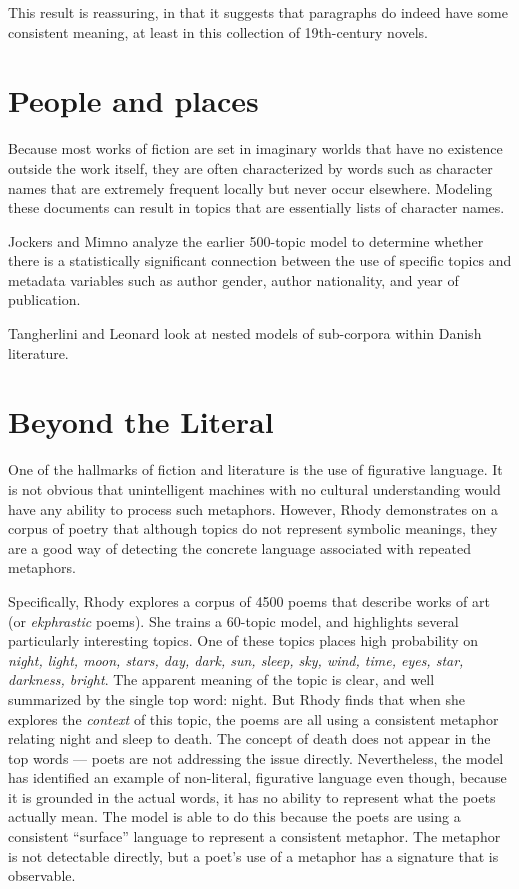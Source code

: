 This result is reassuring, in that it suggests that paragraphs do indeed have some consistent meaning, at least in this collection of 19th-century novels.


\section{People and places}

Because most works of fiction are set in imaginary worlds that have no existence outside the work itself, they are often characterized by words such as character names that are extremely frequent locally but never occur elsewhere. Modeling these documents can result in topics that are essentially lists of character names.

Jockers and Mimno \citep{jockers-13b} analyze the earlier 500-topic model to determine whether there is a statistically significant connection between the use of specific topics and metadata variables such as author gender, author nationality, and year of publication.

Tangherlini and Leonard \citep{tangherlini-13} look at nested models of sub-corpora within Danish literature.

\section{Beyond the Literal}

One of the hallmarks of fiction and literature is the use of figurative language.
It is not obvious that unintelligent machines with no cultural understanding would have any ability to process such metaphors. However, Rhody \citep{rhody-12} demonstrates on a corpus of poetry that although topics do not represent symbolic meanings, they are a good way of detecting the concrete language associated with repeated metaphors.

Specifically, Rhody explores a corpus of 4500 poems that describe works of art (or {\em ekphrastic} poems).
She trains a 60-topic model, and highlights several particularly interesting topics.
One of these topics places high probability on {\em night, light, moon, stars, day, dark, sun, sleep, sky, wind, time, eyes, star, darkness, bright}.
The apparent meaning of the topic is clear, and well summarized by the single top word: night.
But Rhody finds that when she explores the {\em context} of this topic, the poems are all using a consistent metaphor relating night and sleep to death.
The concept of death does not appear in the top words --- poets are not addressing the issue directly.
Nevertheless, the model has identified an example of non-literal, figurative language even though, because it is grounded in the actual words, it has no ability to represent what the poets actually mean.
The model is able to do this because the poets are using a consistent ``surface'' language to represent a consistent metaphor.
The metaphor is not detectable directly, but a poet's use of a metaphor has a signature that is observable.

